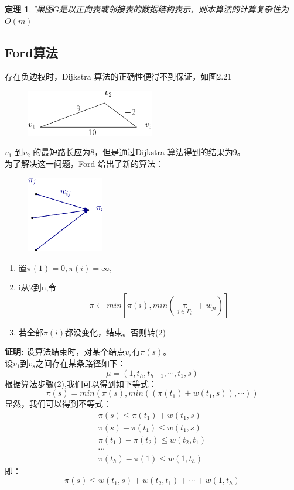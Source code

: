 \documentclass[11pt,a4paper,openany]{book}
\newtheorem{theorem}{\textbf{定理}}[section]
\begin{document}
\begin{theorem}\H
如果图$G$是以正向表或邻接表的数据结构表示，则本算法的计算复杂性为$O(m)$\\
\end{theorem}
\subsection{Ford算法}
存在负边权时，Dijkstra 算法的正确性便得不到保证，如图2.21
\begin{figure}[H]
  \centering
  \includegraphics[width=0.5\textwidth]{2.211.png}\\
  \caption{}
\end{figure}
$v_1$ 到$v_2$ 的最短路长应为8，但是通过Dijkstra 算法得到的结果为9。\\
为了解决这一问题，Ford 给出了新的算法：\\
\begin{figure}[H]
  \centering
  \includegraphics[width=0.3\textwidth]{ford.eps}\\
  \caption*{}
\end{figure}
\begin{enumerate}
  \item 置$\pi(1)=0,\pi(i)=\infty,$
  \item i从2到n,令$$
  \pi\leftarrow min [\pi(i),min(\mathop{\pi(j)}\limits_{j\in\Gamma_i^-} + w_{ji}) ]
  $$
  \item 若全部$\pi(i)$都没变化，结束。否则转(2)
\end{enumerate}
\textbf{证明:}
设算法结束时，对某个结点$v_s$有$\pi(s)$。\\
设$v_1$到$v_s$之间存在某条路径如下：$$\mu=(1,t_h,t_{h-1},\cdots,t_1,s)$$
根据算法步骤(2),我们可以得到如下等式：\\
$$\pi(s)=min(\pi(s),min((\pi(t_1)+w(t_1,s)),\cdots ))$$
显然，我们可以得到不等式：\\
\begin{gather*}
               \pi(s)  \leq \pi(t_1)+w(t_1,s) \\
               \pi(s)  -\pi(t_1)\leq w(t_1,s)\\
               \pi(t_1)  -\pi(t_2)\leq w(t_2,t_1)\\
               \cdots\\
               \pi(t_h)  -\pi(1)\leq w(1,t_h)
\end{gather*}
即：$$\pi(s)\leq w(t_1,s)+w(t_2,t_1)+\cdots+w(1,t_h)$$
\end{document}

